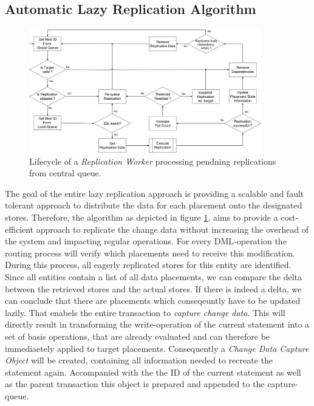 
\subsection{Automatic Lazy Replication Algorithm}
\label{sec:algo}

\begin{figure}[t] 
    \centering
    \includegraphics[width=0.9\textwidth]{Figures/flow_worker.png}
    \caption{Lifecycle of a \textit{Replication Worker} processing pendning replications from central queue.}
    \label{fig:flow_worker}
\end{figure}

The goal of the entire lazy replication approach is providing a scalable and fault tolerant approach to distribute the data for each placement onto the designated stores.
Therefore, the algorithm as depicted in figure \ref{fig:flow_worker}, aims to provide a cost-efficient approach to replicate the change data without increasing 
the overhead of the system and impacting regular operations. 
For every DML-operation the routing process will verify which placements need to receive this modification. During this process, all eagerly replicated stores for this entity
are identified. Since all entities contain a list of all data placements, we can compare the delta between the retrieved stores and the actual stores. 
If there is indeed a delta, we can conclude that there are placements which conseqeuntly have to be updated lazily. 
That enabels the entire transaction to \emph{capture change data}. This will directly result in transforming the write-operation of the current statement into a set of basis 
operations, that are already evaluated and can therefore be immediaetely applied to target placements. Consequently a \emph{Change Data Capture Object} will be created, 
containing all information needed to recreate the statement again. Accompanied with the the ID of the current statement as well as the parent transaction this object is prepared
and appended to the capture-queue.\\

